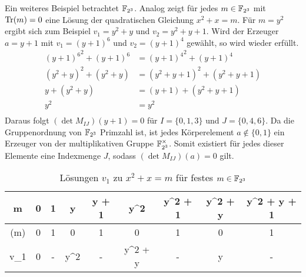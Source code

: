 Ein weiteres Beispiel betrachtet $\field{2}[3]$. Analog zeigt  für jedes $m \in \field{2}[3]$ mit $\mathrm{Tr}(m) = 0$ eine Lösung der quadratischen Gleichung $x^2+x=m$. Für $m=y^2$ ergibt sich zum Beispiel $v_1 = y^2 + y$ und $v_2 = y^2 + y + 1$. Wird der Erzeuger $a = y+1$ mit $v_1 = (y+1)^6$ und $v_2 = (y+1)^4$ gewählt, so wird wieder  erfüllt.
\begin{align*}
    {(y+1)^6}^2 + (y+1)^6 &= {(y+1)^4}^2 + (y+1)^4 \\
    (y^2 + y)^2 + (y^2 + y) &= (y^2 + y + 1)^2 + (y^2 + y + 1) \\
    y + (y^2 + y) &= (y+1) + (y^2 + y + 1) \\
    y^2 &= y^2 \\
\end{align*}
Daraus folgt $(\det M_{IJ})(y+1) = 0$ für $I = \{0,1,3\}$ und $J = \{0,4,6\}$.
Da die Gruppenordnung von $\field{2}[3]$ Primzahl ist, ist jedes Körperelement $a \notin \{0,1\}$ ein Erzeuger von der multiplikativen Gruppe $\field{2}[3]^\times$. Somit existiert für jedes dieser Elemente eine Indexmenge $J$, sodass $(\det M_{IJ})(a) = 0$ gilt.

{\renewcommand{\arraystretch}{1.5}
\begin{table}
    \centering
    \begin{tabular}{|C|C|C|C|C|C|C|C|C|}
    \hline
    m               & 0 & 1 & y & y + 1 & y^2 & y^2 + 1 & y^2 + y  & y^2 + y + 1 \\
    \hline
    (m)  & 0 & 1 & 0 & 1     & 0   & 1       & 0        & 1 \\
    \hline
    v_1         & 0 & - & y^2 & - & y^2 + y & - & y & - \\
    \hline
    \end{tabular}
    \caption{Lösungen $v_1$ zu $x^2 + x = m$ für festes $m \in \field{2}[3]$} \label{table:sol_013F2_3}
\end{table}
}

